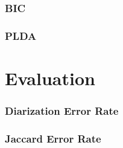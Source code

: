 		\subsubsection{BIC}
		\subsubsection{PLDA}

\section{Evaluation}

	\subsubsection{Diarization Error Rate}
	\subsubsection{Jaccard Error Rate}
